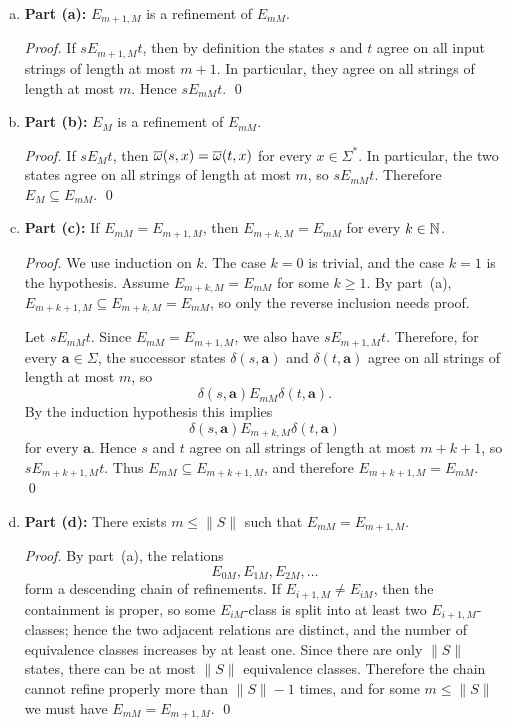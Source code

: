 \begin{enumerate}[{7.}1.]
\begin{enumerate}[(a)]
  \item \textbf{Part (a):} $E_{m+1,M}$ is a refinement of $E_{mM}$.

  \begin{proof}
  If $s E_{m+1,M} t$, then by definition the states $s$ and $t$ agree on all
  input strings of length at most $m+1$.  In particular, they agree on all
  strings of length at most $m$.  Hence $s E_{mM} t$. \qed
  \end{proof}

  \item \textbf{Part (b):} $E_M$ is a refinement of $E_{mM}$.

  \begin{proof}
  If $s E_M t$, then $\overline{\omega}(s,x)=\overline{\omega}(t,x)$ for every $x\in\Sigma^*$.  In
  particular, the two states agree on all strings of length at most $m$, so
  $s E_{mM} t$.  Therefore $E_M\subseteq E_{mM}$. \qed
  \end{proof}

  \item \textbf{Part (c):} If $E_{mM}=E_{m+1,M}$, then
  $E_{m+k,M}=E_{mM}$ for every $k\in\mathbb{N}$.

  \begin{proof}
  We use induction on $k$.  The case $k=0$ is trivial, and the case $k=1$ is the
  hypothesis.  Assume $E_{m+k,M}=E_{mM}$ for some $k\ge 1$.  By part~(a),
  $E_{m+k+1,M}\subseteq E_{m+k,M}=E_{mM}$, so only the reverse inclusion needs
  proof.

  Let $s E_{mM} t$.  Since $E_{mM}=E_{m+1,M}$, we also have $s E_{m+1,M} t$.
  Therefore, for every $\pmb{a}\in\Sigma$, the successor states
  $\delta(s,\pmb{a})$ and $\delta(t,\pmb{a})$ agree on all strings of length at
  most $m$, so
  \[
    \delta(s,\pmb{a}) E_{mM} \delta(t,\pmb{a}).
  \]
  By the induction hypothesis this implies
  \[
    \delta(s,\pmb{a}) E_{m+k,M} \delta(t,\pmb{a})
  \]
  for every $\pmb{a}$.  Hence $s$ and $t$ agree on all strings of length at most
  $m+k+1$, so $s E_{m+k+1,M} t$.  Thus $E_{mM}\subseteq E_{m+k+1,M}$, and
  therefore $E_{m+k+1,M}=E_{mM}$. \qed
  \end{proof}

  \item \textbf{Part (d):} There exists $m\le \|S\|$ such that
  $E_{mM}=E_{m+1,M}$.

  \begin{proof}
  By part~(a), the relations
  \[
    E_{0M},E_{1M},E_{2M},\ldots
  \]
  form a descending chain of refinements.  If $E_{i+1,M}\neq E_{iM}$, then the
  containment is proper, so some $E_{iM}$-class is split into at least two
  $E_{i+1,M}$-classes; hence the two adjacent relations are distinct, and the
  number of equivalence classes increases by at least one.  Since there are only
  $\|S\|$ states, there can be at most $\|S\|$ equivalence classes.  Therefore
  the chain cannot refine properly more than $\|S\|-1$ times, and for some
  $m\le \|S\|$ we must have $E_{mM}=E_{m+1,M}$. \qed
  \end{proof}


\end{enumerate}
\end{enumerate}
